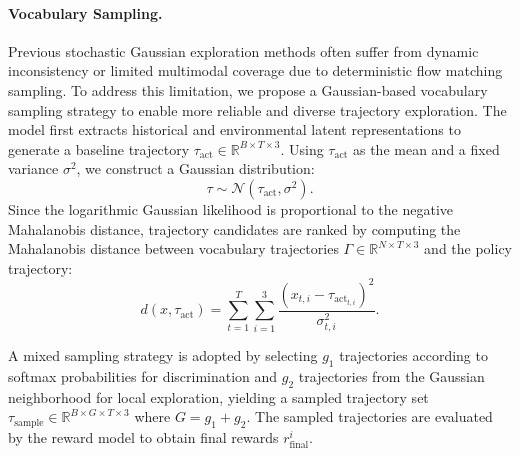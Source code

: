 \documentclass[runningheads]{llncs}
\begin{document}
\paragraph{\textbf{Vocabulary Sampling.}}
Previous stochastic Gaussian exploration methods \cite{yang2025worldrft,zhou2024recogdrive} often suffer from dynamic inconsistency or limited multimodal coverage due to deterministic flow matching sampling. To address this limitation, we propose a Gaussian-based vocabulary sampling strategy to enable more reliable and diverse trajectory exploration. The model first extracts historical and environmental latent representations to generate a baseline trajectory $\tau_{\text{act}} \in \mathbb{R}^{B \times T \times 3}$. Using $\tau_{\text{act}}$ as the mean and a fixed variance $\sigma^2$, we construct a Gaussian distribution:
\begin{equation}
\tau \sim \mathcal{N}(\tau_{\text{act}}, \sigma^2).
\end{equation}
Since the logarithmic Gaussian likelihood is proportional to the negative Mahalanobis distance, trajectory candidates are ranked by computing the Mahalanobis distance between vocabulary trajectories $\Gamma \in \mathbb{R}^{N \times T \times 3}$ and the policy trajectory:
\begin{equation}
d(x,\tau_{\text{act}})=\sum_{t=1}^{T}\sum_{i=1}^{3}\frac{(x_{t,i}-\tau_{\text{act}_{t,i}})^2}{\sigma_{t,i}^2}.
\end{equation}

A mixed sampling strategy is adopted by selecting $g_1$ trajectories according to softmax probabilities for discrimination and $g_2$ trajectories from the Gaussian neighborhood for local exploration, yielding a sampled trajectory set $\tau_{\text{sample}} \in \mathbb{R}^{B \times G \times T \times 3}$ where $G=g_1+g_2$. The sampled trajectories are evaluated by the reward model to obtain final rewards $r^i_{\text{final}}$.
\end{document}

